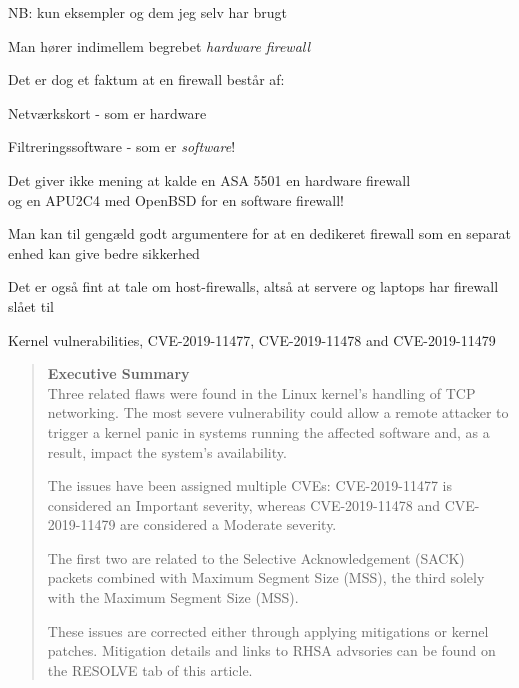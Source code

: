 \documentclass[Screen16to9,17pt]{foils}
\begin{document}
NB: kun eksempler og dem jeg selv har brugt




\begin{list1}
\item Man hører indimellem begrebet \emph{hardware firewall}
\item Det er dog et faktum at en firewall består af:
\begin{list2}
\item Netværkskort - som er hardware
\item Filtreringssoftware - som er \emph{software}!
\end{list2}
\item Det giver ikke mening at kalde en ASA 5501 en hardware firewall\\
  og en APU2C4 med OpenBSD for en software firewall!
\item Man kan til gengæld godt argumentere for at en dedikeret
  firewall som en separat enhed kan give bedre sikkerhed
  \item Det er også fint at tale om host-firewalls, altså at servere og laptops har firewall slået til
\end{list1}


Kernel vulnerabilities, CVE-2019-11477, CVE-2019-11478 and CVE-2019-11479

\begin{quote}\footnotesize{\bf
Executive Summary}\\
Three related flaws were found in the Linux kernel’s handling of TCP networking.  The most severe vulnerability could allow a remote attacker to trigger a kernel panic in systems running the affected software and, as a result, impact the system’s availability.

The issues have been assigned multiple CVEs: CVE-2019-11477 is considered an Important severity, whereas CVE-2019-11478 and CVE-2019-11479 are considered a Moderate severity.

The first two are related to the Selective Acknowledgement (SACK) packets combined with Maximum Segment Size (MSS), the third solely with the Maximum Segment Size (MSS).

These issues are corrected either through applying mitigations or kernel patches.  Mitigation details and links to RHSA advsories can be found on the RESOLVE tab of this article.
\end{quote}
\end{document}
